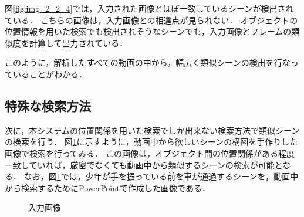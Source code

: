 \documentclass[a4j,12pt,dvipdfmx]{jreport}
\begin{document}
図\ref{fig:img_2_2_4}では，入力された画像とほぼ一致しているシーンが検出されている．
こちらの画像は，入力画像との相違点が見られない．
オブジェクトの位置情報を用いた検索でも検出されそうなシーンでも，入力画像とフレームの類似度を計算して出力されている．

このように，解析したすべての動画の中から，幅広く類似シーンの検出を行なっていることがわかる．

\subsection{特殊な検索方法}
次に，本システムの位置関係を用いた検索でしか出来ない検索方法で類似シーンの検索を行う．
図\ref{fig:img_2_3}に示すように，動画中から欲しいシーンの構図を手作りした画像で検索を行ってみる．
この画像は，オブジェクト間の位置関係がある程度一致していれば，厳密でなくても動画中から類似するシーンの検索が可能となる．
なお，図\ref{fig:img_2_3}では，少年が手を振っている前を車が通過するシーンを，動画中から検索するためにPowerPointで作成した画像である．
\begin{figure}[H]
  \centering
  \caption{入力画像}
  \label{fig:img_2_3}
\end{figure}
\end{document}
